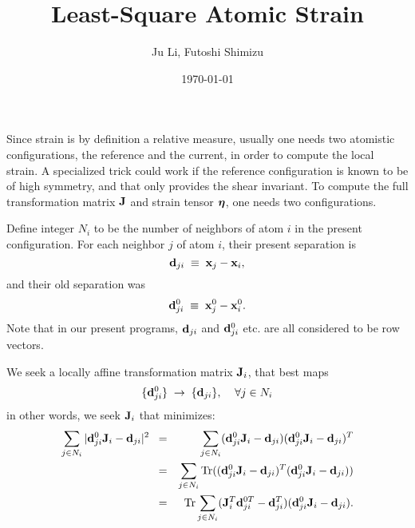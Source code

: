 \documentclass[12pt]{article}
\def\bmath#1{\mbox{\boldmath$#1$}}
\begin{document}


\title{Least-Square Atomic Strain}

\author{Ju Li, Futoshi Shimizu}

\date{\today}

\maketitle

Since strain is by definition a relative measure\cite{WangLYPW95},
usually one needs two atomistic configurations, the reference and the
current, in order to compute the local strain. A specialized trick
could work if the reference configuration is known to be of high
symmetry, and that only provides the shear
invariant\cite{Li99,Li03}. To compute the full transformation matrix
${\bf J}$ and strain tensor $\bmath{\eta}$, one needs two
configurations.

Define integer $N_i$ to be the number of neighbors of atom $i$ in the
present configuration. For each neighbor $j$ of atom $i$, their
present separation is
\begin{equation}
 {\bf d}_{ji} \;\equiv\; {\bf x}_j - {\bf x}_i,
\end{equation}
and their old separation was
\begin{equation}
 {\bf d}_{ji}^0 \;\equiv\; {\bf x}_j^0 - {\bf x}_i^0.
\end{equation}
Note that in our present programs\cite{Li05-2.8,Li05-2.19,Li05-2.31},
${\bf d}_{ji}$ and ${\bf d}_{ji}^0$ etc. are all considered to be row
vectors.

We seek a locally affine transformation matrix ${\bf J}_i$, that best
maps
\begin{equation}
 \{{\bf d}_{ji}^0\} \;\rightarrow\; \{{\bf d}_{ji}\},  \;\;\;\;
 \forall j\in N_i
\end{equation}
in other words, we seek ${\bf J}_i$ that minimizes:
\begin{eqnarray}
\sum_{j\in N_i} | {\bf d}_{ji}^0{\bf J}_i - {\bf d}_{ji} |^2 
 \;\;=&& \sum_{j\in N_i} ({\bf d}_{ji}^0{\bf J}_i - {\bf d}_{ji}) 
 ({\bf d}_{ji}^0{\bf J}_i - {\bf d}_{ji})^T \nonumber\\
=&& \sum_{j\in N_i} {\rm Tr} (({\bf d}_{ji}^0{\bf J}_i - {\bf
 d}_{ji})^T ({\bf d}_{ji}^0{\bf J}_i - {\bf d}_{ji})) \nonumber\\
=&& {\rm Tr} \sum_{j\in N_i} ({\bf J}_i^T {\bf d}_{ji}^{0T} - {\bf d}_{ji}^T) 
({\bf d}_{ji}^0{\bf J}_i - {\bf d}_{ji}).
\end{eqnarray}
\end{document}

